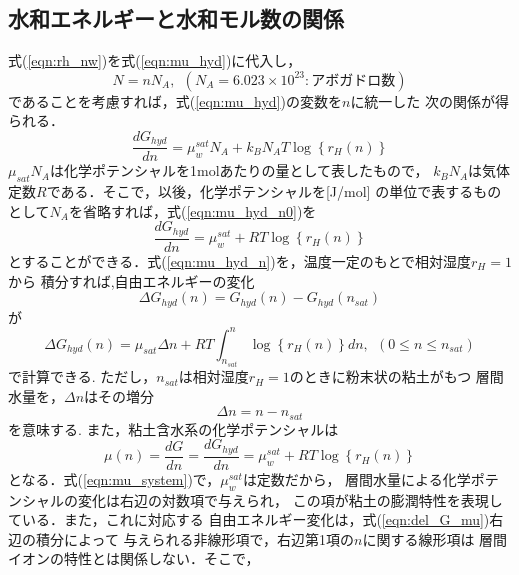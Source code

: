 \subsection{水和エネルギーと水和モル数の関係}
式(\ref{eqn:rh_nw})を式(\ref{eqn:mu_hyd})に代入し，
\begin{equation}
	N=nN_A, \ \ (N_A=6.023\times 10^{23}:アボガドロ数)
	\label{eqn:}
\end{equation}
であることを考慮すれば，式(\ref{eqn:mu_hyd})の変数を\(n\)に統一した
次の関係が得られる．
\begin{equation}
	\frac{d G_{hyd}}{d n}
	=
	\mu_w^{sat}N_A +k_BN_AT \log \left\{ r_H(n) \right\}
	\label{eqn:mu_hyd_n0}
\end{equation}
\(\mu_{sat}N_A\)は化学ポテンシャルを1molあたりの量として表したもので，
\(k_B N_A\)は気体定数\(R\)である．そこで，以後，化学ポテンシャルを[J/mol]
の単位で表するものとして\(N_A\)を省略すれば，式(\ref{eqn:mu_hyd_n0})を
\begin{equation}
	\frac{d G_{hyd}}{d n}
	=
	\mu_w^{sat} +RT \log \left\{ r_H(n) \right\}
	\label{eqn:mu_hyd_n}
\end{equation}
とすることができる．式(\ref{eqn:mu_hyd_n})を，温度一定のもとで相対湿度$r_H=1$から
積分すれば,自由エネルギーの変化
\begin{equation}
	\Delta G_{hyd}(n) = G_{hyd}(n)-G_{hyd}(n_{sat})
	\label{eqn:del_G}
\end{equation}
が
\begin{equation}
	\Delta G_{hyd}(n)
	=
	\mu_{sat}\Delta n
	+
	RT
	\int_{n_{sat}}^{n} \log \left\{ r_H(n)\right\} dn, \ \ (0 \leq n \leq n_{sat})
	\label{eqn:del_G_mu}
\end{equation}
で計算できる. ただし，\(n_{sat}\)は相対湿度\(r_H=1\)のときに粉末状の粘土がもつ
層間水量を，\(\Delta n\)はその増分
\begin{equation}
	\Delta n = n-n_{sat}
\end{equation}
を意味する. また，粘土含水系の化学ポテンシャルは
\begin{equation}
	\mu(n)
	=
	\frac{d G}{d n}
	=
	\frac{d G_{hyd}}{d n}
	=
	\mu_w^{sat} +RT \log \left\{ r_H(n) \right\}
	\label{eqn:mu_system}
\end{equation}
となる．式(\ref{eqn:mu_system})で，$\mu_w^{sat}$は定数だから，
層間水量による化学ポテンシャルの変化は右辺の対数項で与えられ，
この項が粘土の膨潤特性を表現している．また，これに対応する
自由エネルギー変化は，式(\ref{eqn:del_G_mu})右辺の積分によって
与えられる非線形項で，右辺第1項の\(n\)に関する線形項は
層間イオンの特性とは関係しない．そこで，

